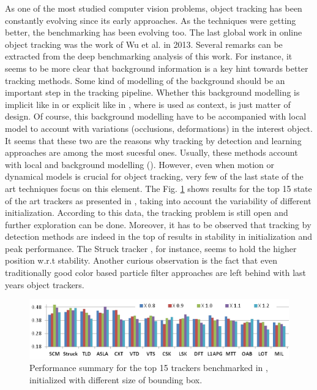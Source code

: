 As one of the most studied computer vision problems, object tracking has been constantly evolving since its early approaches. 
As the techniques were getting better, the benchmarking has been evolving too. The last global work in online object tracking 
was the work of Wu et al. \cite{c16} in 2013. Several remarks can be extracted from the deep benchmarking analysis of this work. 
For instance, it seems to be more clear that background information is a key hint towards 
better tracking methods. Some kind of modelling of the background should be an important 
step in the tracking pipeline. Whether this background modelling is implicit like in \cite{c23} or 
explicit like in \cite{c22}, where is used as context, is just matter of design. Of course, this 
background modelling have to be accompanied with local model to account with variations (occlusions, deformations) in the interest object. 
It seems that these two are the reasons why tracking by detection and learning approaches are among the most sucesful ones. Usually, 
these methods account with local and background modelling (\cite{c22}\cite{c23}\cite{c24}\cite{c25}\cite{c26}). 
However, even when motion or dynamical models is crucial for object tracking, very few of the last state of the art techniques focus on this 
element. The Fig. \ref{tr_per} shows results for the top 15 state of the art trackers as presented in \cite{c16}, taking into account 
the variability of different initialization. According to this data, the tracking problem is still open and further exploration can be done. 
Moreover, it has to be observed that tracking by detection methods are indeed in the top of results in stability in initialization and peak performance. 
The Struck tracker \cite{c23}, for instance, seems to hold the higher position w.r.t stability. Another curious observation is the fact that even traditionally good color based particle filter approaches are left behind with last years object trackers.

   \begin{figure}[thpb]
      \centering
      \includegraphics[width=1.0\textwidth]{../images/trackers_performance.png}
      \caption{ Performance summary for the top 15 trackers benchmarked in \cite{c16}, initialized with different size of bounding box. }
      \label{tr_per}
   \end{figure}

